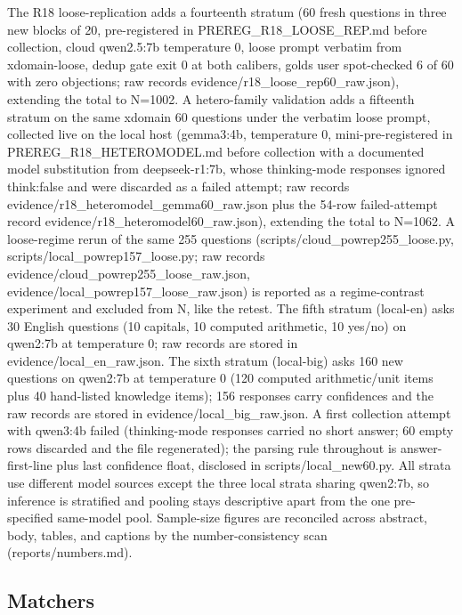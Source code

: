 \documentclass[10pt]{article} %
\begin{document}
The R18 loose-replication adds a fourteenth stratum (60 fresh questions in three new blocks of 20, pre-registered in PREREG\_R18\_LOOSE\_REP.md before collection, cloud qwen2.5:7b temperature 0, loose prompt verbatim from xdomain-loose, dedup gate exit 0 at both calibers, golds user spot-checked 6 of 60 with zero objections; raw records evidence/r18\_loose\_rep60\_raw.json), extending the total to N=1002.
A hetero-family validation adds a fifteenth stratum on the same xdomain 60 questions under the verbatim loose prompt, collected live on the local host (gemma3:4b, temperature 0, mini-pre-registered in PREREG\_R18\_HETEROMODEL.md before collection with a documented model substitution from deepseek-r1:7b, whose thinking-mode responses ignored think:false and were discarded as a failed attempt; raw records evidence/r18\_heteromodel\_gemma60\_raw.json plus the 54-row failed-attempt record evidence/r18\_heteromodel60\_raw.json), extending the total to N=1062. A loose-regime rerun of the same 255 questions (scripts/cloud\_powrep255\_loose.py, scripts/local\_powrep157\_loose.py; raw records evidence/cloud\_powrep255\_loose\_raw.json, evidence/local\_powrep157\_loose\_raw.json) is reported as a regime-contrast experiment and excluded from N, like the retest.
The fifth stratum (local-en) asks 30 English questions (10 capitals, 10 computed arithmetic, 10 yes/no) on qwen2:7b at temperature 0; raw records are stored in evidence/local\_en\_raw.json.
The sixth stratum (local-big) asks 160 new questions on qwen2:7b at temperature 0 (120 computed arithmetic/unit items plus 40 hand-listed knowledge items); 156 responses carry confidences and the raw records are stored in evidence/local\_big\_raw.json.
A first collection attempt with qwen3:4b failed (thinking-mode responses carried no short answer; 60 empty rows discarded and the file regenerated); the parsing rule throughout is answer-first-line plus last confidence float, disclosed in scripts/local\_new60.py.
All strata use different model sources except the three local strata sharing qwen2:7b, so inference is stratified and pooling stays descriptive apart from the one pre-specified same-model pool.
Sample-size figures are reconciled across abstract, body, tables, and captions by the number-consistency scan (reports/numbers.md).

\subsection{Matchers}
\end{document}
